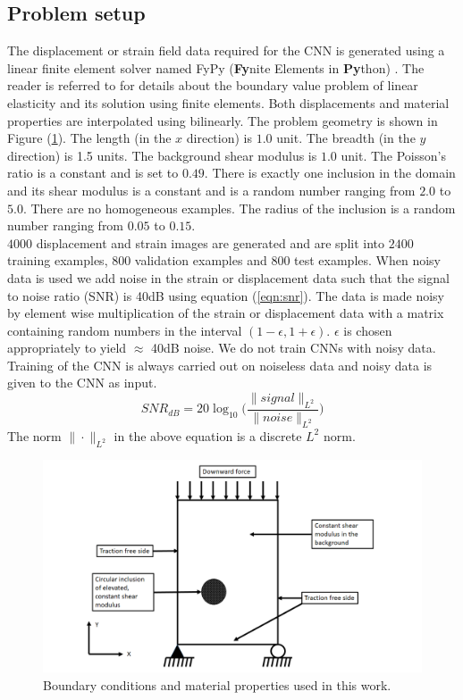 \documentclass[12pt]{article}
\begin{document}
\subsection{\label{sect:probsetup}Problem setup}
The displacement or strain field data required for the CNN is generated using a linear finite element solver named FyPy (\textbf{Fy}nite Elements in \textbf{Py}thon) \cite{misc:fypy}. The reader is referred to \cite{book:hugheslinear,book:fishbelytschko} for details about the boundary value problem of linear elasticity and its solution using finite elements. Both displacements and material properties are interpolated using bilinearly. The problem geometry is shown in Figure (\ref{fig:bc}). The length (in the $x$ direction) is $1.0$ unit. The breadth (in the $y$ direction) is 1.5 units. The background shear modulus is $1.0$ unit. The Poisson's ratio is a constant and is set to $0.49$. There is exactly one inclusion in the domain and its shear modulus is a constant and is a random number ranging from $2.0$ to $5.0$. There are no homogeneous examples. The radius of the inclusion is a random number ranging from $0.05$ to $0.15$.\\
$4000$ displacement and strain images are generated and are split into $2400$ training examples, $800$ validation examples and $800$ test examples. When noisy data is used we add noise in the strain or displacement data such that the signal to noise ratio (SNR) is 40dB using equation (\ref{eqn:snr}). The data is made noisy by element wise multiplication of the strain or displacement data with a matrix containing random numbers in the interval $(1-\epsilon,1+\epsilon)$. $\epsilon$ is chosen appropriately to yield $\approx$ 40dB noise. We do not train CNNs with noisy data. Training of the CNN is always carried out on noiseless data and noisy data is given to the CNN as input. 
\begin{equation}
  \label{eqn:snr}
  SNR_{dB} = 20\log_{10}\Big(\frac{\|signal\|_{L^2}}{\|noise\|_{L^2}}\Big)
\end{equation}
The norm $\|\cdot\|_{L^2}$ in the above equation is a discrete $L^2$ norm. 
%
\begin{figure}[h] 
   \centering
    \includegraphics[totalheight=9cm]{Figures/bc.png}
  \caption{\label{fig:bc}Boundary conditions and material properties used in this work. }
\end{figure}
%
\end{document}
